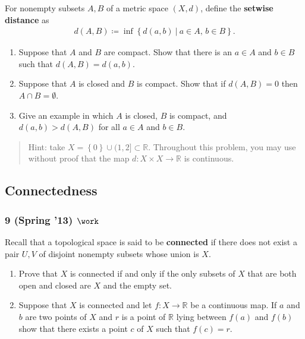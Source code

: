 \begin{problem}[Spring 2021, 3]

For nonempty subsets \(A, B\) of a metric space \((X, d)\), define the
\textbf{setwise distance} as
\begin{align*}
d(A, B) \coloneqq\inf \left\{{ d(a, b) {~\mathrel{\Big|}~}a\in A,\, b\in B }\right\} 
.\end{align*}

\begin{enumerate}
\def\labelenumi{\alph{enumi}.}
\item
  Suppose that \(A\) and \(B\) are compact. Show that there is an
  \(a\in A\) and \(b\in B\) such that \(d(A, B) = d(a, b)\).
\item
  Suppose that \(A\) is closed and \(B\) is compact. Show that if
  \(d(A, B) = 0\) then \(A \cap B = \emptyset\).
\item
  Give an example in which \(A\) is closed, \(B\) is compact, and
  \(d(a, b) > d(A, B)\) for all \(a\in A\) and \(b\in B\).
\end{enumerate}

\begin{quote}
Hint: take \(X = \left\{{ 0 }\right\} \cup(1, 2] \subset {\mathbb{R}}\).
Throughout this problem, you may use without proof that the map
\(d:X\times X\to {\mathbb{R}}\) is continuous.
\end{quote}

\end{problem}

\hypertarget{connectedness}{%
\subsection{Connectedness}\label{connectedness}}

\hypertarget{spring-13-work}{%
\subsubsection{\texorpdfstring{9 (Spring '13)
\(\work\)}{9 (Spring '13) \textbackslash work}}\label{spring-13-work}}

\begin{problem}[?]

Recall that a topological space is said to be \textbf{connected} if
there does not exist a pair \(U, V\) of disjoint nonempty subsets whose
union is \(X\).

\begin{enumerate}
\def\labelenumi{\alph{enumi}.}
\item
  Prove that \(X\) is connected if and only if the only subsets of \(X\)
  that are both open and closed are \(X\) and the empty set.
\item
  Suppose that \(X\) is connected and let \(f : X \to {\mathbb{R}}\) be
  a continuous map. If \(a\) and \(b\) are two points of \(X\) and \(r\)
  is a point of \({\mathbb{R}}\) lying between \(f (a)\) and \(f (b)\)
  show that there exists a point \(c\) of \(X\) such that \(f (c) = r\).
\end{enumerate}

\end{problem}


